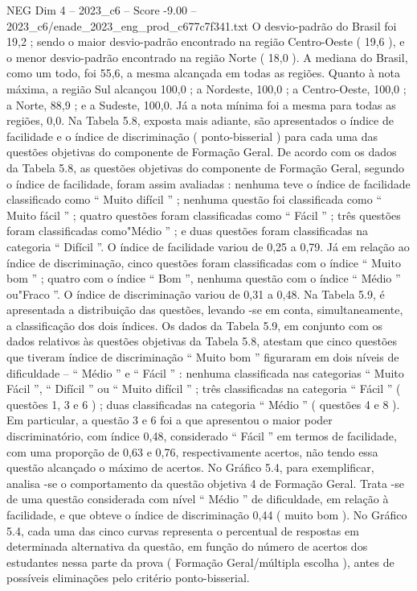 \begin{textsample}{NEG Dim 4 – 2023\_c6 – Score -9.00 – 2023\_c6/enade\_2023\_eng\_prod\_c677c7f341.txt}
O desvio-padrão do Brasil foi 19,2 ; sendo o maior desvio-padrão encontrado na região Centro-Oeste ( 19,6 ), e o menor desvio-padrão encontrado na região Norte ( 18,0 ).
A mediana do Brasil, como um todo, foi 55,6, a mesma alcançada em todas as regiões.
Quanto à nota máxima, a região Sul alcançou 100,0 ; a Nordeste, 100,0 ; a Centro-Oeste, 100,0 ; a Norte, 88,9 ; e a Sudeste, 100,0.
Já a nota mínima foi a mesma para todas as regiões, 0,0.
Na Tabela 5.8, exposta mais adiante, são apresentados o índice de facilidade e o índice de discriminação ( ponto-bisserial ) para cada uma das questões objetivas do componente de Formação Geral.
De acordo com os dados da Tabela 5.8, as questões objetivas do componente de Formação Geral, segundo o índice de facilidade, foram assim avaliadas : nenhuma teve o índice de facilidade classificado como “ Muito difícil ” ; nenhuma questão foi classificada como “ Muito fácil ” ; quatro questões foram classificadas como “ Fácil ” ; três questões foram classificadas como"Médio ” ; e duas questões foram classificadas na categoria “ Difícil ”.
O índice de facilidade variou de 0,25 a 0,79.
Já em relação ao índice de discriminação, cinco questões foram classificadas com o índice “ Muito bom ” ; quatro com o índice “ Bom ”, nenhuma questão com o índice “ Médio ” ou"Fraco ”.
O índice de discriminação variou de 0,31 a 0,48.
Na Tabela 5.9, é apresentada a distribuição das questões, levando -se em conta, simultaneamente, a classificação dos dois índices.
Os dados da Tabela 5.9, em conjunto com os dados relativos às questões objetivas da Tabela 5.8, atestam que cinco questões que tiveram índice de discriminação “ Muito bom ” figuraram em dois níveis de dificuldade – “ Médio ” e “ Fácil ” : nenhuma classificada nas categorias “ Muito Fácil ”, “ Difícil ” ou “ Muito difícil ” ; três classificadas na categoria “ Fácil ” ( questões 1, 3 e 6 ) ; duas classificadas na categoria “ Médio ” ( questões 4 e 8 ).
Em particular, a questão 3 e 6 foi a que apresentou o maior poder discriminatório, com índice 0,48, considerado “ Fácil ” em termos de facilidade, com uma proporção de 0,63 e 0,76, respectivamente acertos, não tendo essa questão alcançado o máximo de acertos.
No Gráfico 5.4, para exemplificar, analisa -se o comportamento da questão objetiva 4 de Formação Geral.
Trata -se de uma questão considerada com nível “ Médio ” de dificuldade, em relação à facilidade, e que obteve o índice de discriminação 0,44 ( muito bom ).
No Gráfico 5.4, cada uma das cinco curvas representa o percentual de respostas em determinada alternativa da questão, em função do número de acertos dos estudantes nessa parte da prova ( Formação Geral/múltipla escolha ), antes de possíveis eliminações pelo critério ponto-bisserial.

\end{textsample}
